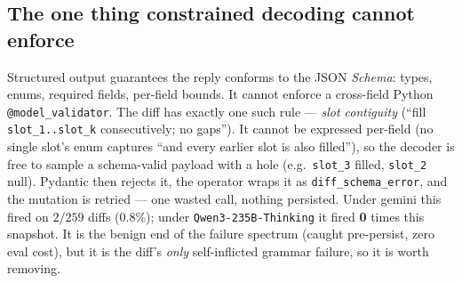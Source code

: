 \documentclass[11pt]{article}
\begin{document}
\subsection{The one thing constrained decoding cannot enforce}
Structured output guarantees the reply conforms to the JSON \emph{Schema}: types, enums, required
fields, per-field bounds. It cannot enforce a cross-field Python \texttt{@model\_validator}. The diff
has exactly one such rule --- \emph{slot contiguity} (``fill \texttt{slot\_1..slot\_k}
consecutively; no gaps''). It cannot be expressed per-field (no single slot's enum captures ``and
every earlier slot is also filled''), so the decoder is free to sample a schema-valid payload with a
hole (e.g.\ \texttt{slot\_3} filled, \texttt{slot\_2} null). Pydantic then rejects it, the operator
wraps it as \texttt{diff\_schema\_error}, and the mutation is retried --- one wasted call, nothing
persisted. Under gemini this fired on $2/259$ diffs (0.8\%); under \texttt{Qwen3-235B-Thinking} it
fired \textbf{0} times this snapshot. It is the benign end of the failure spectrum (caught pre-persist,
zero eval cost), but it is the diff's \emph{only} self-inflicted grammar failure, so it is worth
removing.
\end{document}
